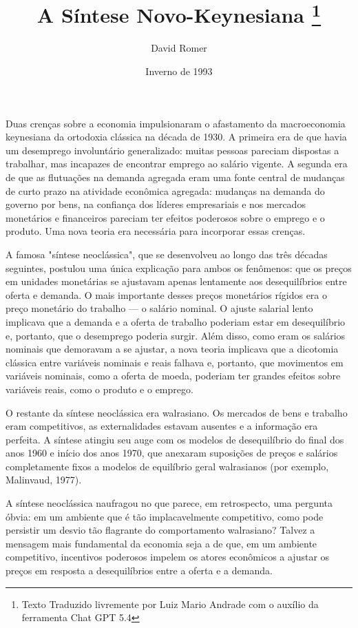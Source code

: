 \documentclass[12pt]{article}
\title{A Síntese Novo-Keynesiana \thanks{Texto Traduzido livremente por Luiz Mario Andrade com o auxílio da ferramenta Chat GPT 5.4}}
\author{David Romer}
\date{Inverno de 1993}
\begin{document}
\maketitle

Duas crenças sobre a economia impulsionaram o afastamento da macroeconomia keynesiana da ortodoxia clássica na década de 1930. A primeira era de que havia um desemprego involuntário generalizado: muitas pessoas pareciam dispostas a trabalhar, mas incapazes de encontrar emprego ao salário vigente. A segunda era de que as flutuações na demanda agregada eram uma fonte central de mudanças de curto prazo na atividade econômica agregada: mudanças na demanda do governo por bens, na confiança dos líderes empresariais e nos mercados monetários e financeiros pareciam ter efeitos poderosos sobre o emprego e o produto. Uma nova teoria era necessária para incorporar essas crenças.

A famosa "síntese neoclássica", que se desenvolveu ao longo das três décadas seguintes, postulou uma única explicação para ambos os fenômenos: que os preços em unidades monetárias se ajustavam apenas lentamente aos desequilíbrios entre oferta e demanda. O mais importante desses preços monetários rígidos era o preço monetário do trabalho — o salário nominal. O ajuste salarial lento implicava que a demanda e a oferta de trabalho poderiam estar em desequilíbrio e, portanto, que o desemprego poderia surgir. Além disso, como eram os salários nominais que demoravam a se ajustar, a nova teoria implicava que a dicotomia clássica entre variáveis nominais e reais falhava e, portanto, que movimentos em variáveis nominais, como a oferta de moeda, poderiam ter grandes efeitos sobre variáveis reais, como o produto e o emprego.

O restante da síntese neoclássica era walrasiano. Os mercados de bens e trabalho eram competitivos, as externalidades estavam ausentes e a informação era perfeita. A síntese atingiu seu auge com os modelos de desequilíbrio do final dos anos 1960 e início dos anos 1970, que anexaram suposições de preços e salários completamente fixos a modelos de equilíbrio geral walrasianos (por exemplo, Malinvaud, 1977).

A síntese neoclássica naufragou no que parece, em retrospecto, uma pergunta óbvia: em um ambiente que é tão implacavelmente competitivo, como pode persistir um desvio tão flagrante do comportamento walrasiano? Talvez a mensagem mais fundamental da economia seja a de que, em um ambiente competitivo, incentivos poderosos impelem os atores econômicos a ajustar os preços em resposta a desequilíbrios entre a oferta e a demanda.
\end{document}
